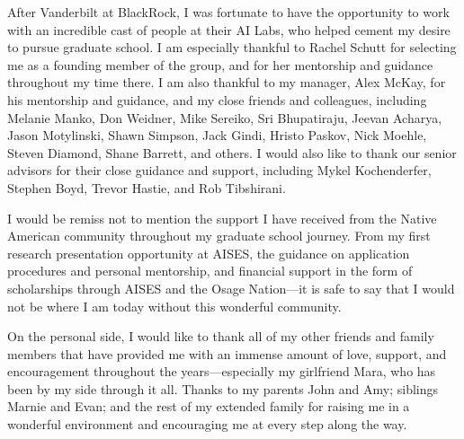 \begin{acknowledgments}
    After Vanderbilt at BlackRock, I was fortunate to have the opportunity to work with an incredible cast of people at their AI Labs, who helped cement my desire to pursue graduate school. I am especially thankful to Rachel Schutt for selecting me as a founding member of the group, and for her mentorship and guidance throughout my time there. I am also thankful to my manager, Alex McKay, for his mentorship and guidance, and my close friends and colleagues, including
    Melanie Manko,
    Don Weidner,
    Mike Sereiko,
    Sri Bhupatiraju,
    Jeevan Acharya,
    Jason Motylinski,
    Shawn Simpson,
    Jack Gindi,
    Hristo Paskov,
    Nick Moehle,
    Steven Diamond,
    Shane Barrett,
    and others.
    I would also like to thank our senior advisors for their close guidance and support, including
    Mykel Kochenderfer,
    Stephen Boyd,
    Trevor Hastie,
    and Rob Tibshirani.

    I would be remiss not to mention the support I have received from the Native American community throughout my graduate school journey. From my first research presentation opportunity at AISES, the guidance on application procedures and personal mentorship, and financial support in the form of scholarships through AISES and the Osage Nation---it is safe to say that I would not be where I am today without this wonderful community.

    On the personal side, I would like to thank all of my other friends and family members that have provided me with an immense amount of love, support, and encouragement throughout the years---especially my girlfriend Mara, who has been by my side through it all.
    Thanks to my parents John and Amy;
    siblings Marnie and Evan;
    and the rest of my extended family
    for raising me in a wonderful environment and
    encouraging me at every step along the way.
\end{acknowledgments}
